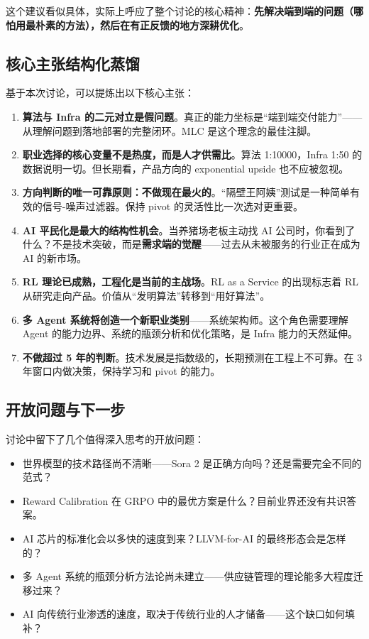 这个建议看似具体，实际上呼应了整个讨论的核心精神：\textbf{先解决端到端的问题（哪怕用最朴素的方法），然后在有正反馈的地方深耕优化}。

\subsection{核心主张结构化蒸馏}

基于本次讨论，可以提炼出以下核心主张：

\begin{enumerate}
    \item \textbf{算法与 Infra 的二元对立是假问题}。真正的能力坐标是``端到端交付能力''——从理解问题到落地部署的完整闭环。MLC 是这个理念的最佳注脚。
    \item \textbf{职业选择的核心变量不是热度，而是人才供需比}。算法 1:10000，Infra 1:50 的数据说明一切。但长期看，产品方向的 exponential upside 也不应被忽视。
    \item \textbf{方向判断的唯一可靠原则：不做现在最火的}。``隔壁王阿姨''测试是一种简单有效的信号-噪声过滤器。保持 pivot 的灵活性比一次选对更重要。
    \item \textbf{AI 平民化是最大的结构性机会}。当养猪场老板主动找 AI 公司时，你看到了什么？不是技术突破，而是\textbf{需求端的觉醒}——过去从未被服务的行业正在成为 AI 的新市场。
    \item \textbf{RL 理论已成熟，工程化是当前的主战场}。RL as a Service 的出现标志着 RL 从研究走向产品。价值从``发明算法''转移到``用好算法''。
    \item \textbf{多 Agent 系统将创造一个新职业类别}——系统架构师。这个角色需要理解 Agent 的能力边界、系统的瓶颈分析和优化策略，是 Infra 能力的天然延伸。
    \item \textbf{不做超过 5 年的判断}。技术发展是指数级的，长期预测在工程上不可靠。在 3 年窗口内做决策，保持学习和 pivot 的能力。
\end{enumerate}

\subsection{开放问题与下一步}

讨论中留下了几个值得深入思考的开放问题：

\begin{itemize}
    \item 世界模型的技术路径尚不清晰——Sora 2 是正确方向吗？还是需要完全不同的范式？
    \item Reward Calibration 在 GRPO 中的最优方案是什么？目前业界还没有共识答案。
    \item AI 芯片的标准化会以多快的速度到来？LLVM-for-AI 的最终形态会是怎样的？
    \item 多 Agent 系统的瓶颈分析方法论尚未建立——供应链管理的理论能多大程度迁移过来？
    \item AI 向传统行业渗透的速度，取决于传统行业的人才储备——这个缺口如何填补？
\end{itemize}

